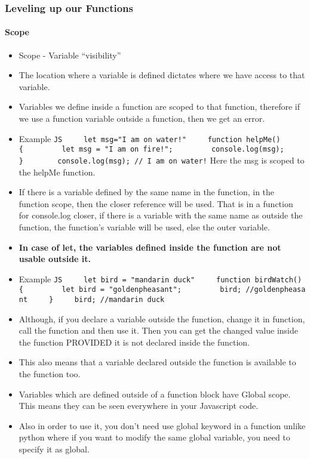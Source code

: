 \documentclass[
  paper=a4,
  ,captions=tableheading
]{scrartcl}
\providecommand{\tightlist}{%
  \setlength{\itemsep}{0pt}\setlength{\parskip}{0pt}}
\begin{document}
\hypertarget{leveling-up-our-functions}{%
\subsubsection{Leveling up our
Functions}\label{leveling-up-our-functions}}

\hypertarget{scope}{%
\paragraph{Scope}\label{scope}}

\begin{itemize}
\tightlist
\item
  Scope - Variable ``visibility''
\item
  The location where a variable is defined dictates where we have access
  to that variable.
\item
  Variables we define inside a function are scoped to that function,
  therefore if we use a function variable outside a function, then we
  get an error.
\item
  Example
  \texttt{JS\ \ \ \ \ let\ msg="I\ am\ on\ water!"\ \ \ \ \ function\ helpMe()\{\ \ \ \ \ \ \ \ \ let\ msg\ =\ "I\ am\ on\ fire!";\ \ \ \ \ \ \ \ \ console.log(msg);\ \ \ \ \ \}\ \ \ \ \ \ \ \ console.log(msg);\ //\ I\ am\ on\ water!}
  Here the msg is scoped to the helpMe function.
\item
  If there is a variable defined by the same name in the function, in
  the function scope, then the closer reference will be used. That is in
  a function for console.log closer, if there is a variable with the
  same name as outside the function, the function's variable will be
  used, else the outer variable.
\item
  \textbf{In case of let, the variables defined inside the function are
  not usable outside it.}
\item
  Example
  \texttt{JS\ \ \ \ \ let\ bird\ =\ "mandarin\ duck"\ \ \ \ \ function\ birdWatch()\{\ \ \ \ \ \ \ \ \ let\ bird\ =\ "goldenpheasant";\ \ \ \ \ \ \ \ \ bird;\ //goldenpheasant\ \ \ \ \ \}\ \ \ \ \ bird;\ //mandarin\ duck}
\item
  Although, if you declare a variable outside the function, change it in
  function, call the function and then use it. Then you can get the
  changed value inside the function PROVIDED it is not declared inside
  the function.
\item
  This also means that a variable declared outside the function is
  available to the function too.
\item
  Variables which are defined outside of a function block have Global
  scope. This means they can be seen everywhere in your Javascript code.
\item
  Also in order to use it, you don't need use global keyword in a
  function unlike python where if you want to modify the same global
  variable, you need to specify it as global.
\end{itemize}
\end{document}
